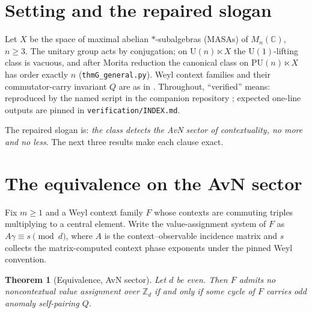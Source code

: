 \documentclass[11pt]{article}
\newtheorem{theorem}{Theorem}
\theoremstyle{remark}
\theoremstyle{plain}
\newcommand{\U}{\mathrm{U}}
\newcommand{\PU}{\mathrm{PU}}
\begin{document}
\section{Setting and the repaired slogan}
Let $X$ be the space of maximal abelian $*$-subalgebras (MASAs) of $M_n(\mathbb{C})$,
$n\geq 3$. The unitary group acts by conjugation; on $\U(n)\ltimes X$ the
$\U(1)$-lifting class is vacuous, and after Morita reduction the canonical class on
$\PU(n)\ltimes X$ has order exactly $n$ \cite[Vacuity, Upper bound and Lower bound
theorems]{paperA}
(\texttt{thmG\_general.py}). Weyl context families and their commutator-carry invariant
$Q$ are as in \cite{paperB}. Throughout, ``verified'' means: reproduced by the named
script in the companion repository \cite{repo}; expected one-line outputs are pinned in
\texttt{verification/INDEX.md}.

The repaired slogan is: \emph{the class detects the AvN sector of contextuality, no more
and no less}. The next three results make each clause exact.

\section{The equivalence on the AvN sector}
Fix $m\geq 1$ and a Weyl context family $F$ whose contexts are commuting
triples multiplying to a central element. Write the value-assignment system of $F$ as
$A\gamma \equiv s \pmod d$, where $A$ is the context--observable incidence matrix and
$s$ collects the matrix-computed context phase exponents under the pinned Weyl
convention.

\begin{theorem}[Equivalence, AvN sector]\label{thm:equiv}
Let $d$ be \emph{even}. Then $F$ admits no noncontextual value assignment over
$\mathbb{Z}_d$ if and only if some cycle of $F$ carries odd anomaly self-pairing $Q$.
\end{theorem}
\end{document}
